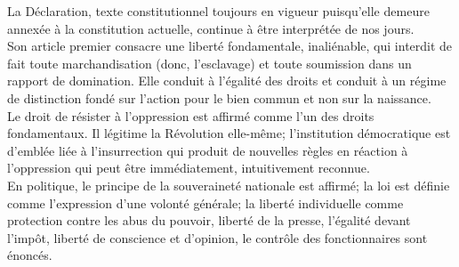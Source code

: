 \documentclass[
  french,
  letterpaper,
  DIV=11,
  numbers=noendperiod]{scrartcl}
\begin{document}
La Déclaration, texte constitutionnel toujours en vigueur puisqu'elle
demeure annexée à la constitution actuelle, continue à être interprétée
de nos jours.\\
Son article premier consacre une liberté fondamentale, inaliénable, qui
interdit de fait toute marchandisation (donc, l'esclavage) et toute
soumission dans un rapport de domination. Elle conduit à l'égalité des
droits et conduit à un régime de distinction fondé sur l'action pour le
bien commun et non sur la naissance.\\
Le droit de résister à l'oppression est affirmé comme l'un des droits
fondamentaux. Il légitime la Révolution elle-même; l'institution
démocratique est d'emblée liée à l'insurrection qui produit de nouvelles
règles en réaction à l'oppression qui peut être immédiatement,
intuitivement reconnue.\\
En politique, le principe de la souveraineté nationale est affirmé; la
loi est définie comme l'expression d'une volonté générale; la liberté
individuelle comme protection contre les abus du pouvoir, liberté de la
presse, l'égalité devant l'impôt, liberté de conscience et d'opinion, le
contrôle des fonctionnaires sont énoncés.
\end{document}
